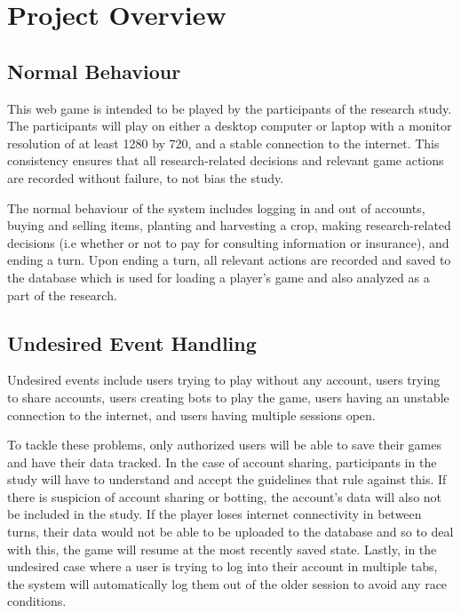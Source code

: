 \documentclass[12pt, titlepage]{article}
\begin{document}
\section{Project Overview}

\subsection{Normal Behaviour}

This web game is intended to be played by the participants of the research study. The participants will play on either a desktop computer or laptop with a monitor resolution of at least 1280 by 720, and a stable connection to the internet. This consistency ensures that all research-related decisions and relevant game actions are recorded without failure, to not bias the study.

The normal behaviour of the system includes logging in and out of accounts, buying and selling items, planting and harvesting a crop, making research-related decisions (i.e whether or not to pay for consulting information or insurance), and ending a turn. Upon ending a turn, all relevant actions are recorded and saved to the database which is used for loading a player's game and also analyzed as a part of the research.

\subsection{Undesired Event Handling}

Undesired events include users trying to play without any account, users trying to share accounts, users creating bots to play the game, users having an unstable connection to the internet, and users having multiple sessions open.

 To tackle these problems, only authorized users will be able to save their games and have their data tracked. In the case of account sharing, participants in the study will have to understand and accept the guidelines that rule against this. If there is suspicion of account sharing or botting, the account's data will also not be included in the study. If the player loses internet connectivity in between turns, their data would not be able to be uploaded to the database and so to deal with this, the game will resume at the most recently saved state. Lastly, in the undesired case where a user is trying to log into their account in multiple tabs, the system will automatically log them out of the older session to avoid any race conditions.
\end{document}

